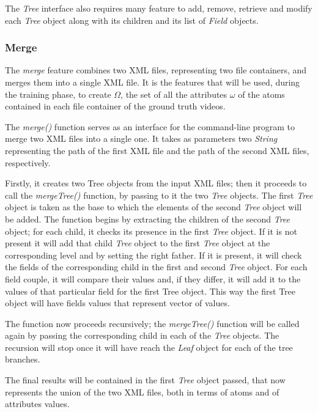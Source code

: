 The \emph{Tree} interface also requires many feature to add, remove, retrieve and modify each \emph{Tree} object along with its children and its list of \emph{Field} objects.

\subsubsection{Merge}

The \emph{merge} feature combines two XML files, representing two file containers, and merges them into a single XML file. It is the features that will be used, during the training phase, to create $\Omega$, the set of all the attributes $\omega$ of the atoms contained in each file container of the ground truth videos.

The \emph{merge()} function serves as an interface for the command-line program to merge two XML files into a single one. It takes as parameters two \emph{String} representing the path of the first XML file and the path of the second XML files, respectively.

Firstly, it creates two Tree objects from the input XML files; then it proceeds to call the \emph{mergeTree()} function, by passing to it the two \emph{Tree} objects. The first \emph{Tree} object is taken as the base to which the elements of the second \emph{Tree} object will be added. The function begins by extracting the children of the second \emph{Tree} object; for each child, it checks its presence in the first \emph{Tree} object.
If it is not present it will add that child \emph{Tree} object to the first \emph{Tree} object at the corresponding level and by setting the right father.
If it is present, it will check the fields of the corresponding child in the first and second \emph{Tree} object. For each field couple, it will compare their values and, if they differ, it will add it to the values of that particular field for the first Tree object. This way the first Tree object will have fields values that represent vector of values.

The function now proceeds recursively; the \emph{mergeTree()} function will be called again by passing the corresponding child in each of the \emph{Tree} objects. The recursion will stop once it will have reach the \emph{Leaf} object for each of the tree branches.

The final results will be contained in the first \emph{Tree} object passed, that now represents the union of the two XML files, both in terms of atoms and of attributes values.

